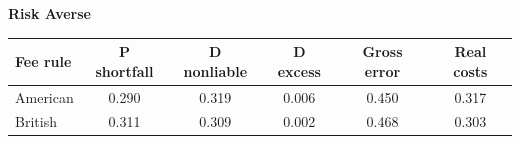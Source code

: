 \documentclass[10pt,border=5pt,varwidth=17cm]{standalone}
\begin{document}
\begingroup
\small
\setlength{\tabcolsep}{5pt}
\renewcommand{\arraystretch}{1.20}
\noindent\textbf{Risk Averse}\par\smallskip
\noindent\begin{tabularx}{\linewidth}{@{}>{\raggedright\arraybackslash}Xccccc@{}}
\toprule
\textbf{Fee rule} & \textbf{P shortfall} & \textbf{D nonliable} & \textbf{D excess} & \textbf{Gross error} & \textbf{Real costs} \\
\midrule
American & 0.290 & 0.319 & 0.006 & 0.450 & 0.317 \\
British & 0.311 & 0.309 & 0.002 & 0.468 & 0.303 \\
\bottomrule\end{tabularx}\par\medskip
\endgroup
\end{document}
